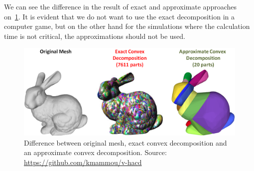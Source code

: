 We can see the difference in the result of exact and approximate approaches on~\cref{fig:bunny}. It is evident that we do not want to use the exact decomposition in a computer game, but on the other hand for the simulations where the calculation time is not critical, the approximations should not be used.
\begin{figure}
        \centering
        \includegraphics[width=\textwidth]{img/bunny}
        \caption{Difference between original mesh, exact convex decomposition and an approximate convex decomposition. Source: \url{https://github.com/kmammou/v-hacd}}
        \label{fig:bunny}
\end{figure}


